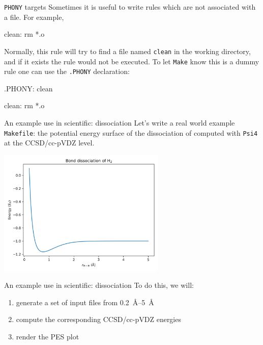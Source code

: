 \documentclass[10pt]{beamer}
\newcommand{\textco}[1]{\colorbox{bg_gray}{\texttt{#1}}}
\begin{document}
\begin{frame}[fragile]{\texttt{PHONY} targets}
  Sometimes it is useful to write rules which are not associated with a file.
  For example,
\begin{makefile}
clean:
    rm *.o
\end{makefile}
  \pause
  Normally, this rule will try to find a file named \textco{clean} in the
  working directory, and if it exists the rule would not be executed. To let
  \textco{Make} know this is a dummy rule one can use the \textco{.PHONY} declaration:
\begin{makefile}
.PHONY: clean

clean:
    rm *.o
\end{makefile}
\end{frame}


\begin{frame}[fragile]{An example use in scientific:  dissociation}
  Let's write a real world example \textco{Makefile}: the potential energy surface
  of the dissociation of  computed with \texttt{Psi4} at the CCSD/cc-pVDZ level.
  \begin{center}
    \includegraphics[width=8cm]{h2_dissociation.png}
  \end{center}
\end{frame}

\begin{frame}[fragile]{An example use in scientific:  dissociation}
  To do this, we will:
  \begin{enumerate}
    \item generate a set of input files from \SIrange{0.2}{5}{\angstrom}
    \item compute the corresponding CCSD/cc-pVDZ energies
    \item render the PES plot
  \end{enumerate}
  \pause
  \begin{center}
\end{center}
\end{frame}
\end{document}
